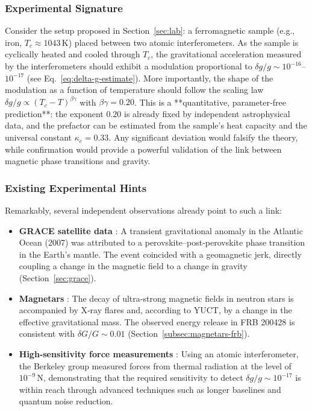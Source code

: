 \documentclass[12pt]{article}
\theoremstyle{remark}
\begin{document}
	\subsubsection{Experimental Signature}
	
	Consider the setup proposed in Section~\ref{sec:lab}: a ferromagnetic sample (e.g., iron, \(T_c \approx 1043\,\mathrm{K}\)) placed between two atomic interferometers. As the sample is cyclically heated and cooled through \(T_c\), the gravitational acceleration measured by the interferometers should exhibit a modulation proportional to \(\delta g/g \sim 10^{-16}\)–\(10^{-17}\) (see Eq.~\ref{eq:delta-g-estimate}). More importantly, the shape of the modulation as a function of temperature should follow the scaling law \(\delta g/g \propto (T_c - T)^{\beta\gamma}\) with \(\beta\gamma = 0.20\). This is a **quantitative, parameter‑free prediction**: the exponent \(0.20\) is already fixed by independent astrophysical data, and the prefactor can be estimated from the sample’s heat capacity and the universal constant \(\kappa_c = 0.33\). Any significant deviation would falsify the theory, while confirmation would provide a powerful validation of the link between magnetic phase transitions and gravity.
	
	\subsubsection{Existing Experimental Hints}
	
	Remarkably, several independent observations already point to such a link:
	
	\begin{itemize}
		\item \textbf{GRACE satellite data} \cite{Rosat2025}: A transient gravitational anomaly in the Atlantic Ocean (2007) was attributed to a perovskite–post‑perovskite phase transition in the Earth’s mantle. The event coincided with a geomagnetic jerk, directly coupling a change in the magnetic field to a change in gravity (Section~\ref{sec:grace}).
		\item \textbf{Magnetars} \cite{Kaspi2017}: The decay of ultra‑strong magnetic fields in neutron stars is accompanied by X‑ray flares and, according to YUCT, by a change in the effective gravitational mass. The observed energy release in FRB 200428 is consistent with \(\delta G/G \sim 0.01\) (Section~\ref{subsec:magnetars-frb}).
		\item \textbf{High‑sensitivity force measurements} \cite{Muller2017}: Using an atomic interferometer, the Berkeley group measured forces from thermal radiation at the level of \(10^{-9}\,\mathrm{N}\), demonstrating that the required sensitivity to detect \(\delta g/g \sim 10^{-17}\) is within reach through advanced techniques such as longer baselines and quantum noise reduction.
	\end{itemize}
	
\end{document}
